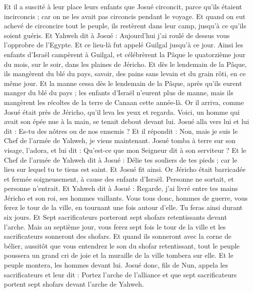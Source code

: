 \begin{multicols}{2}
Et il a suscité à leur place leurs enfants que Josué circoncit, parce qu'ils étaient incirconcis ; car on ne les avait pas circoncis pendant le voyage.
Et quand on eut achevé de circoncire tout le peuple, ils restèrent dans leur camp, jusqu'à ce qu'ils soient guéris.
Et Yahweh dit à Josué : Aujourd'hui j'ai roulé de dessus vous l'opprobre de l'Egypte. Et ce lieu-là fut appelé Guilgal jusqu'à ce jour.
Ainsi les enfants d'Israël campèrent à Guilgal, et célébrèrent la Pâque le quatorzième jour du mois, sur le soir, dans les plaines de Jéricho.
Et dès le lendemain de la Pâque, ils mangèrent du blé du pays, savoir, des pains sans levain et du grain rôti, en ce même jour.
Et la manne cessa dès le lendemain de la Pâque, après qu'ils eurent manger du blé du pays ; les enfants d'Israël n'eurent plus de manne, mais ils mangèrent les récoltes de la terre de Canaan cette année-là.
Or il arriva, comme Josué était près de Jéricho, qu'il leva les yeux et regarda. Voici, un homme qui avait son épée nue à la main, se tenait debout devant lui. Josué alla vers lui et lui dit : Es-tu des nôtres ou de nos ennemis ?
Et il répondit : Non, mais je suis le Chef de l'armée de Yahweh, je viens maintenant. Josué tomba à terre sur son visage, l'adora, et lui dit : Qu'est-ce que mon Seigneur dit à son serviteur ?
Et le Chef de l'armée de Yahweh dit à Josué : Délie tes souliers de tes pieds ; car le lieu sur lequel tu te tiens est saint. Et Josué fit ainsi.
\VerseOne{}Or Jéricho était barricadée et fermée soigneusement, à cause des enfants d'Israël. Personne ne sortait, et personne n'entrait.
Et Yahweh dit à Josué : Regarde, j'ai livré entre tes mains Jéricho et son roi, ses hommes vaillants.
Vous tous donc, hommes de guerre, vous ferez le tour de la ville, en tournant une fois autour d'elle. Tu feras ainsi durant six jours.
Et Sept sacrificateurs porteront sept shofars retentissants devant l'arche. Mais au septième jour, vous ferez sept fois le tour de la ville et les sacrificateurs sonneront des shofars.
Et quand ils sonneront avec la corne de bélier, aussitôt que vous entendrez le son du shofar retentissant, tout le peuple poussera un grand cri de joie et la muraille de la ville tombera sur elle. Et le peuple montera, les hommes devant lui.
Josué donc, fils de Nun, appela les sacrificateurs et leur dit : Portez l'arche de l'alliance et que sept sacrificateurs portent sept shofars devant l'arche de Yahweh.

\end{multicols}
